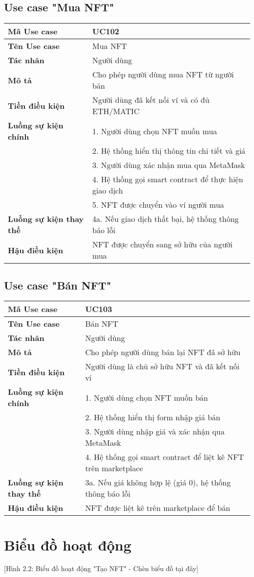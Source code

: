 \subsection{Use case "Mua NFT"}
\begin{tabular}{|l|p{10cm}|}
    \hline
    \textbf{Mã Use case} & UC102 \\
    \hline
    \textbf{Tên Use case} & Mua NFT \\
    \hline
    \textbf{Tác nhân} & Người dùng \\
    \hline
    \textbf{Mô tả} & Cho phép người dùng mua NFT từ người bán \\
    \hline
    \textbf{Tiền điều kiện} & Người dùng đã kết nối ví và có đủ ETH/MATIC \\
    \hline
    \textbf{Luồng sự kiện chính} & 1. Người dùng chọn NFT muốn mua \\
    & 2. Hệ thống hiển thị thông tin chi tiết và giá \\
    & 3. Người dùng xác nhận mua qua MetaMask \\
    & 4. Hệ thống gọi smart contract để thực hiện giao dịch \\
    & 5. NFT được chuyển vào ví người mua \\
    \hline
    \textbf{Luồng sự kiện thay thế} & 4a. Nếu giao dịch thất bại, hệ thống thông báo lỗi \\
    \hline
    \textbf{Hậu điều kiện} & NFT được chuyển sang sở hữu của người mua \\
    \hline
\end{tabular}

\subsection{Use case "Bán NFT"}
\begin{tabular}{|l|p{10cm}|}
    \hline
    \textbf{Mã Use case} & UC103 \\
    \hline
    \textbf{Tên Use case} & Bán NFT \\
    \hline
    \textbf{Tác nhân} & Người dùng \\
    \hline
    \textbf{Mô tả} & Cho phép người dùng bán lại NFT đã sở hữu \\
    \hline
    \textbf{Tiền điều kiện} & Người dùng là chủ sở hữu NFT và đã kết nối ví \\
    \hline
    \textbf{Luồng sự kiện chính} & 1. Người dùng chọn NFT muốn bán \\
    & 2. Hệ thống hiển thị form nhập giá bán \\
    & 3. Người dùng nhập giá và xác nhận qua MetaMask \\
    & 4. Hệ thống gọi smart contract để liệt kê NFT trên marketplace \\
    \hline
    \textbf{Luồng sự kiện thay thế} & 3a. Nếu giá không hợp lệ (giá 0), hệ thống thông báo lỗi \\
    \hline
    \textbf{Hậu điều kiện} & NFT được liệt kê trên marketplace để bán \\
    \hline
\end{tabular}

\section{Biểu đồ hoạt động}
[Hình 2.2: Biểu đồ hoạt động "Tạo NFT" - Chèn biểu đồ tại đây] \\
[Hình 2.3: Biểu đồ hoạt động "Mua NFT" - Chèn biểu đồ tại đây] \\
[Hình 2.4: Biểu đồ hoạt động "Bán NFT" - Chèn biểu đồ tại đây] 
